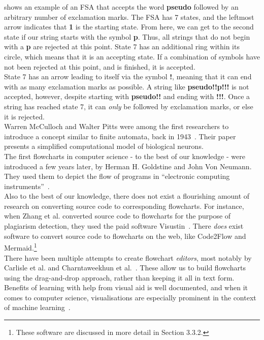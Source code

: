  shows an example of an FSA that accepts the word \textbf{pseudo} followed by an arbitrary number of exclamation marks. The FSA has 7 states, and the leftmost arrow indicates that \textbf{1} is the starting state. From here, we can get to the second state if our string starts with the symbol \textbf{p}. Thus, all strings that do not begin with a \textbf{p} are rejected at this point. State 7 has an additional ring within its circle, which means that it is an accepting state. If a combination of symbols have not been rejected at this point, and is finished, it is accepted. \\

State 7 has an arrow leading to itself via the symbol \textbf{!}, meaning that it can end with as many exclamation marks as possible. A string like \textbf{pseudo!!p!!!} is not accepted, however, despite starting with \textbf{pseudo!!} and ending with \textbf{!!!}. Once a string has reached state 7, it can \textit{only} be followed by exclamation marks, or else it is rejected. \\

Warren McCulloch and Walter Pitts were among the first researchers to introduce a concept similar to finite automata, back in 1943~\cite{firstFSA}. Their paper presents a simplified computational model of biological neurons. \\

The first flowcharts in computer science - to the best of our knowledge - were introduced a few years later, by Herman H. Goldstine and John Von Neumann. They used them to depict the flow of programs in ``electronic computing instruments''~\cite{flowchartIn40s}. \\

Also to the best of our knowledge, there does not exist a flourishing amount of research on converting source code to corresponding flowcharts. For instance, when Zhang et al. converted source code to flowcharts for the purpose of plagiarism detection, they used the paid software Visustin~\cite{paperOnPlagiarism}. There \textit{does} exist software to convert source code to flowcharts on the web, like Code2Flow and Mermaid.\footnote{These software are discussed in more detail in Section 3.3.2.} \\

There have been multiple attempts to create flowchart \textit{editors}, most notably by Carlisle et al. and Charntaweekhun et al.~\cite{flowchartEditor1, flowchartEditor2}. These allow us to build flowcharts using the drag-and-drop approach, rather than keeping it all in text form. Benefits of learning with help from visual aid is well documented, and when it comes to computer science, visualisations are especially prominent in the context of machine learning~\cite{ML_Visual1, ML_Visual2, ML_Visual3}. \\

